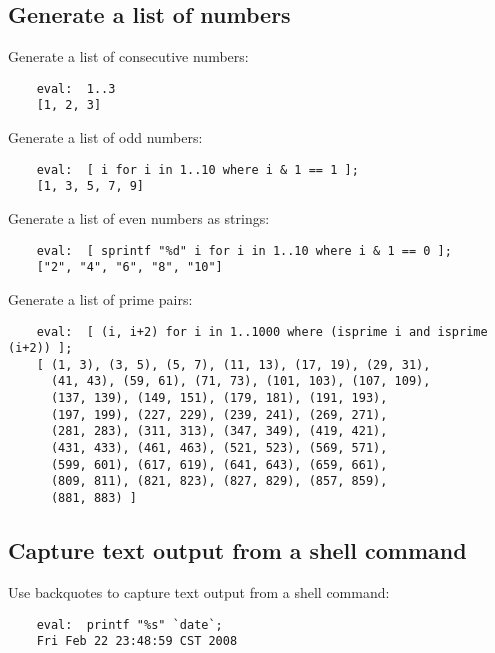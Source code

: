 \cutend*

\subsection{Generate a list of numbers}

Generate a list of consecutive numbers:
\begin{verbatim}
    eval:  1..3
    [1, 2, 3]
\end{verbatim}

Generate a list of odd numbers:
\begin{verbatim}
    eval:  [ i for i in 1..10 where i & 1 == 1 ];
    [1, 3, 5, 7, 9]
\end{verbatim}

Generate a list of even numbers as strings:
\begin{verbatim}
    eval:  [ sprintf "%d" i for i in 1..10 where i & 1 == 0 ];
    ["2", "4", "6", "8", "10"]
\end{verbatim}

Generate a list of prime pairs:
\begin{verbatim}
    eval:  [ (i, i+2) for i in 1..1000 where (isprime i and isprime (i+2)) ];
    [ (1, 3), (3, 5), (5, 7), (11, 13), (17, 19), (29, 31), 
      (41, 43), (59, 61), (71, 73), (101, 103), (107, 109), 
      (137, 139), (149, 151), (179, 181), (191, 193), 
      (197, 199), (227, 229), (239, 241), (269, 271), 
      (281, 283), (311, 313), (347, 349), (419, 421), 
      (431, 433), (461, 463), (521, 523), (569, 571), 
      (599, 601), (617, 619), (641, 643), (659, 661), 
      (809, 811), (821, 823), (827, 829), (857, 859), 
      (881, 883) ]
\end{verbatim}


\cutend*

\subsection{Capture text output from a shell command}

Use backquotes to capture text output from a shell command:
\begin{verbatim}
    eval:  printf "%s" `date`;
    Fri Feb 22 23:48:59 CST 2008
\end{verbatim}

\cutend*

